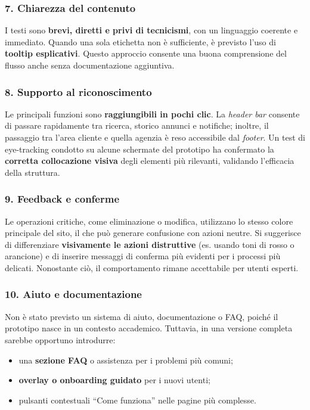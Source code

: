 \subsubsection*{7. Chiarezza del contenuto}  
I testi sono \textbf{brevi, diretti e privi di tecnicismi}, con un linguaggio coerente e immediato.  
Quando una sola etichetta non è sufficiente, è previsto l’uso di \textbf{tooltip esplicativi}.  
Questo approccio consente una buona comprensione del flusso anche senza documentazione aggiuntiva.

\subsubsection*{8. Supporto al riconoscimento}  
Le principali funzioni sono \textbf{raggiungibili in pochi clic}.  
La \textit{header bar} consente di passare rapidamente tra ricerca, storico annunci e notifiche; inoltre, il passaggio tra l’area cliente e quella agenzia è reso accessibile dal \textit{footer}.  
Un test di eye-tracking condotto su alcune schermate del prototipo ha confermato la \textbf{corretta collocazione visiva} degli elementi più rilevanti, validando l’efficacia della struttura.

\subsubsection*{9. Feedback e conferme}  
Le operazioni critiche, come eliminazione o modifica, utilizzano lo stesso colore principale del sito, il che può generare confusione con azioni neutre.  
Si suggerisce di differenziare \textbf{visivamente le azioni distruttive} (es. usando toni di rosso o arancione) e di inserire messaggi di conferma più evidenti per i processi più delicati.  
Nonostante ciò, il comportamento rimane accettabile per utenti esperti.

\subsubsection*{10. Aiuto e documentazione}  
Non è stato previsto un sistema di aiuto, documentazione o FAQ, poiché il prototipo nasce in un contesto accademico.  
Tuttavia, in una versione completa sarebbe opportuno introdurre:  
\begin{itemize}
    \item una \textbf{sezione FAQ} o assistenza per i problemi più comuni;  
    \item \textbf{overlay o onboarding guidato} per i nuovi utenti;  
    \item pulsanti contestuali “Come funziona” nelle pagine più complesse.  
\end{itemize}

